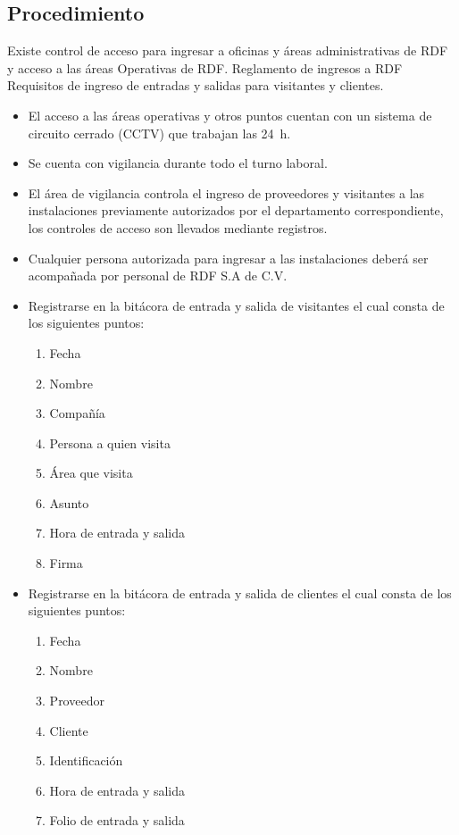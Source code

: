 \subsection{Procedimiento}
Existe control de acceso para ingresar a oficinas y áreas administrativas de \gls{RDF} y acceso a las áreas Operativas de \gls{RDF}.
Reglamento de ingresos a \gls{RDF}
Requisitos de ingreso de entradas y salidas para visitantes y clientes.

\begin{itemize}
	\item El acceso a las áreas operativas y otros puntos cuentan con un sistema de circuito cerrado (CCTV) que trabajan las \qty{24}{\hour}.
	\item Se cuenta con vigilancia durante todo el turno laboral.
	\item El área de vigilancia controla el ingreso de proveedores y visitantes a las instalaciones previamente autorizados por el departamento correspondiente, los controles de acceso son llevados mediante registros.
	\item Cualquier persona autorizada para ingresar a las instalaciones deberá ser acompañada por personal de \gls{RDF} S.A de C.V.
	\item Registrarse en la bitácora de entrada y salida de visitantes el cual consta de los siguientes puntos:
	\begin{enumerate}
		\item Fecha
		\item Nombre
		\item Compañía
		\item Persona a quien visita
		\item Área que visita
		\item Asunto
		\item Hora de entrada y salida
		\item Firma
	\end{enumerate}
	\item Registrarse en la bitácora de entrada y salida de clientes el cual consta de los siguientes puntos:
	\begin{enumerate}
		\item Fecha
		\item Nombre
		\item Proveedor
		\item Cliente
		\item Identificación
		\item Hora de entrada y salida
		\item Folio de entrada y salida

\end{enumerate}
\end{itemize}
